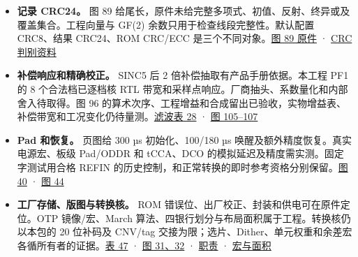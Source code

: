 \documentclass[UTF8,fontset=none,zihao=-4,a4paper]{ctexart}
\begin{document}
\begin{itemize}
\item \textbf{记录 CRC24。} 图 89 给尾长，原件未给完整多项式、\allowbreak{}初值、\allowbreak{}反射、\allowbreak{}终异或及覆盖集合。工程向量与 GF(2) 余数只用于检查线段完整性。默认配置 CRC8、\allowbreak{}结果 CRC24、\allowbreak{}ROM CRC/ECC 是三个不同对象。\href{https://www.analog.com/media/en/technical-documentation/data-sheets/ad4080.pdf\#page=60}{图 89 原件} · \href{https://github.com/defineiocc02/20bit\_SAR\_ADC\_Behaviour\_Verification/blob/feat/ad4080-peripherals/subsys/ad4080\_peripherals/io/adi\_crc/README.md}{CRC 判别资料}\par
\item \textbf{补偿响应和精确校正。} SINC5 后 2 倍补偿抽取有产品手册依据。本工程 PF1 的 8 个合法档已逐档核 RTL 带宽和采样点响应。厂商抽头、\allowbreak{}系数量化和内部舍入待取得。图 96 的算术次序、\allowbreak{}工程增益和合成留出已验收，实物增益表、\allowbreak{}补偿带宽和工况变化仍待量测。\href{https://www.analog.com/media/en/technical-documentation/data-sheets/ad4080.pdf\#page=64}{滤波表 28} · \href{https://www.analog.com/media/en/technical-documentation/data-sheets/ad4080.pdf\#page=70}{图 105–107}\par
\item \textbf{Pad 和恢复。} 页图给 300 µs 初始化、\allowbreak{}100/180 µs 唤醒及额外精度恢复。真实电源宏、\allowbreak{}板级 Pad/\relax{}ODDR 和 tCCA、\allowbreak{}DCO 的模拟延迟及精度需实测。固定字测试用合格 REFIN 的历史控制，和正常转换的即时参考资格分别保留。\href{https://www.analog.com/media/en/technical-documentation/data-sheets/ad4080.pdf\#page=24}{图 40} · \href{https://www.analog.com/media/en/technical-documentation/data-sheets/ad4080.pdf\#page=27}{图 44}\par
\item \textbf{工厂存储、\allowbreak{}版图与转换核。} ROM 错误位、\allowbreak{}出厂校正、\allowbreak{}封装和供电可在原件定位。OTP 镜像/宏、\allowbreak{}March 算法、\allowbreak{}四银行划分与布局面积属于工程。转换核仍以本包的 20 位补码及 CNV/tag 交接为限；选片、\allowbreak{}Dither、\allowbreak{}单元权重和余差宏各循所有者的证据。\href{https://www.analog.com/media/en/technical-documentation/data-sheets/ad4080.pdf\#page=83}{表 47} · \href{https://www.analog.com/media/en/technical-documentation/data-sheets/ad4080.pdf\#page=19}{图 31、\allowbreak{}32} · \href{https://github.com/defineiocc02/20bit\_SAR\_ADC\_Behaviour\_Verification/blob/feat/ad4080-peripherals/subsys/ad4080\_peripherals/interfaces/function\_ownership.csv}{职责} · \href{https://github.com/defineiocc02/20bit\_SAR\_ADC\_Behaviour\_Verification/blob/feat/ad4080-peripherals/subsys/ad4080\_peripherals/budget/README.md}{宏与面积}\par
\end{itemize}
\end{document}
